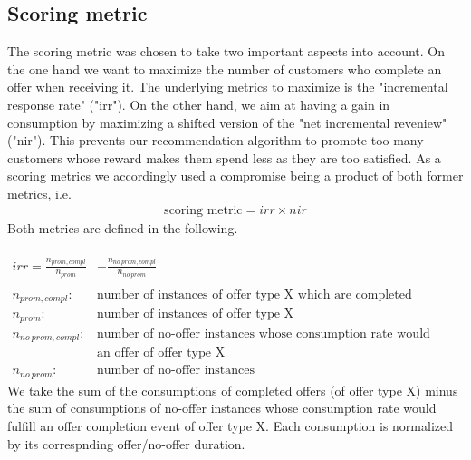 \documentclass[11pt]{article} %
\begin{document}
\subsection{Scoring metric}
The scoring metric was chosen to take two important aspects into account.
On the one hand we want to maximize the number of customers who complete an offer when receiving it. The underlying metrics to maximize is the "incremental response rate" ("irr").
On the other hand, we aim at having a gain in consumption by maximizing a shifted version of the "net incremental reveniew" ("nir").
This prevents our recommendation algorithm to promote too many customers whose reward makes them spend less as they are too satisfied.
As a scoring  metrics we accordingly used a compromise being a product of both former metrics, i.e.
\begin{align}
\text{scoring metric}= irr \times nir
\end{align}
Both metrics are defined in the following.
%
\\
\\
\begin{align}
irr=\frac{ n_{prom,compl} }{ n_{prom}} &-\frac{ n_{no\ prom,compl} }{ n_{no\ prom}}
\\
\nonumber\\
n_{prom,compl}:& \text{number of instances of offer type X which are completed}\nonumber
\\
n_{prom}:& \text{number of instances of offer type X}\nonumber
\\
n_{no\ prom,compl}:& \text{number of no-offer instances whose consumption rate would have completed}\nonumber
\\
& \text{an offer of offer type X}\nonumber
\\
n_{no\ prom}:& \text{number of no-offer instances}\nonumber
\end{align}
We take the sum of the consumptions of completed offers (of offer type X) minus the sum of consumptions of no-offer instances whose consumption rate would fulfill an offer completion event of offer type X.
Each consumption is normalized by its correspnding offer/no-offer duration.
\end{document}
